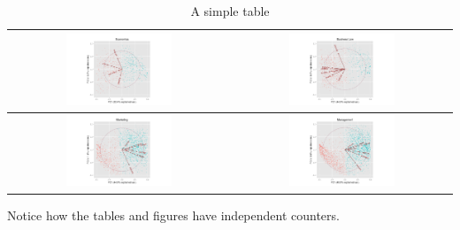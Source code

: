 \documentclass[a4paper,12pt]{article}
\begin{document}
\begin{table}[h!]
  \begin{center}
    \begin{tabular}{| c | c |}

    \hline
    \includegraphics[width=0.5\textwidth]{figures/EconomicsPCA}
    &
    \includegraphics[width=0.5\textwidth]{figures/BusinessLawPCA}
    \\
    \hline
    \includegraphics[width=0.5\textwidth]{figures/MarketingPCA}
	&    
    \includegraphics[width=0.5\textwidth]{figures/ManagementPCA}
    \\
    \hline
    \end{tabular}
  \end{center}
  \caption{A simple table}
\end{table}


Notice how the tables and figures
have independent counters.
\end{document}
